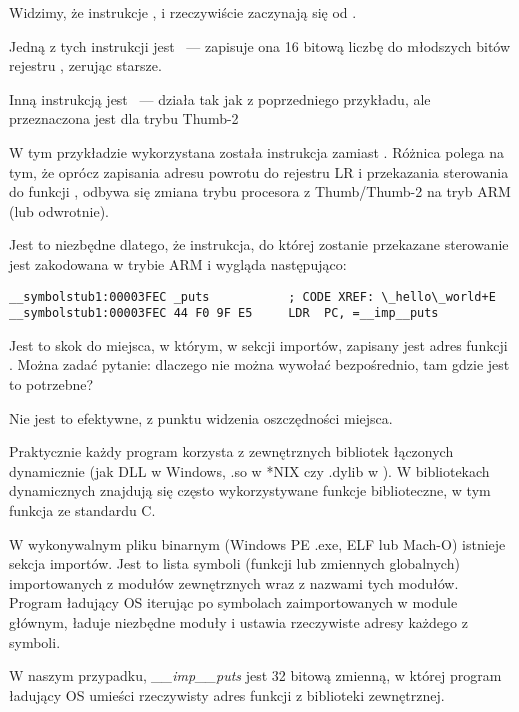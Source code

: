 Widzimy, że instrukcje ,  i  rzeczywiście zaczynają się od .

Jedną z tych instrukcji jest
~--- zapisuje ona 16 bitową liczbę do młodszych bitów rejestru , zerując starsze.

Inną instrukcją jest ~---  działa tak jak  z poprzedniego przykładu, ale przeznaczona jest dla trybu Thumb-2

W tym przykładzie wykorzystana została instrukcja  zamiast .
Różnica polega na tym, że oprócz zapisania adresu powrotu do rejestru \ac{LR} i przekazania sterowania
do funkcji \puts, odbywa się zmiana trybu procesora z Thumb/Thumb-2 na tryb ARM (lub odwrotnie).

Jest to niezbędne dlatego, że instrukcja, do której zostanie przekazane sterowanie jest zakodowana w trybie ARM i wygląda następująco:

\begin{lstlisting}[style=customasmARM]
__symbolstub1:00003FEC _puts           ; CODE XREF: \_hello\_world+E
__symbolstub1:00003FEC 44 F0 9F E5     LDR  PC, =__imp__puts
\end{lstlisting}

Jest to skok do miejsca, w którym, w sekcji importów, zapisany jest adres funkcji \puts.
Można zadać pytanie: dlaczego nie można wywołać \puts bezpośrednio, tam gdzie jest to potrzebne?

Nie jest to efektywne, z punktu widzenia oszczędności miejsca.

Praktycznie każdy program korzysta z zewnętrznych bibliotek łączonych dynamicznie (jak DLL w Windows, .so w *NIX
czy .dylib w \MacOSX).
W bibliotekach dynamicznych znajdują się często wykorzystywane funkcje biblioteczne, w tym funkcja \puts ze standardu C.

W wykonywalnym pliku binarnym (Windows PE .exe, ELF lub Mach-O) istnieje sekcja importów.
Jest to lista symboli (funkcji lub zmiennych globalnych) importowanych z modułów zewnętrznych wraz z nazwami tych modułów.
Program ładujący \ac{OS} iterując po symbolach zaimportowanych w module głównym, ładuje niezbędne moduły i ustawia rzeczywiste adresy każdego z symboli.

W naszym przypadku, \emph{\_\_imp\_\_puts} jest 32 bitową zmienną, w której program ładujący \ac{OS} umieści rzeczywisty adres funkcji z biblioteki zewnętrznej.

